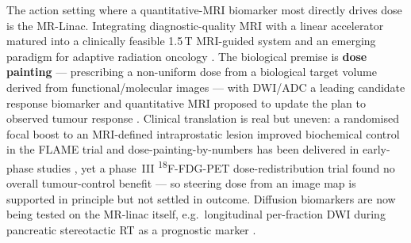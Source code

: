 \documentclass[review,number]{elsarticle}
\begin{document}
The action setting where a quantitative-MRI biomarker most directly drives dose is the
MR-Linac. Integrating diagnostic-quality MRI with a linear accelerator
\cite{lagendijk2008,raaymakers2009} matured into a clinically feasible 1.5\,T MRI-guided
system \cite{raaymakers2017,lagendijk2014} and an emerging paradigm for adaptive
radiation oncology \cite{otazo2021,hall2022}. The biological premise is \textbf{dose
painting} --- prescribing a non-uniform dose from a biological target volume derived from
functional/molecular images
\cite{ling2000,bentzen2005,bentzen2011}%
{} --- with DWI/ADC a leading candidate response biomarker \cite{leibfarth2018} and
quantitative MRI proposed to update the plan to observed tumour response
\cite{vanhoudt2021,otazo2021}. Clinical translation is real but uneven: a randomised
focal boost to an MRI-defined intraprostatic lesion improved biochemical control in the
FLAME trial \cite{kerkmeijer2021} and dose-painting-by-numbers has been delivered in
early-phase studies \cite{berwouts2013}, yet a phase~III \textsuperscript{18}F-FDG-PET
dose-redistribution trial found no overall tumour-control benefit \cite{deleeuw2024} ---
so steering dose from an image map is supported in principle but not settled in outcome.
Diffusion biomarkers are now being tested on the MR-linac itself, e.g.\ longitudinal
per-fraction DWI during pancreatic stereotactic RT as a prognostic marker
\cite{bisgaard2024}.
\end{document}
